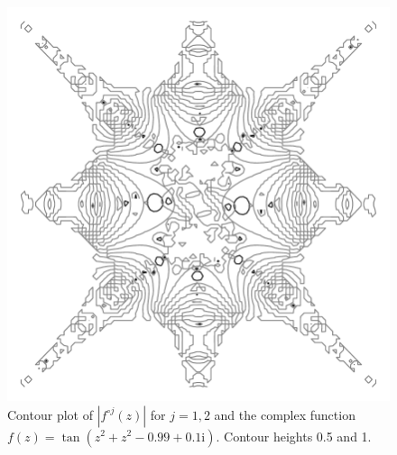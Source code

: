 \documentclass[12pt, a4paper]{amsart}
\newcommand{\mi}{\text{i}}  %
\begin{document}
\pagebreak
\begin{figure}[!ht]
\includegraphics[width=160mm]{mite.pdf}
\caption{
Contour plot of $|f^{\circ j}(z)|$ for $j = 1, 2$ and the complex function $f(z) = \tan(z^2  + z^2 - 0.99 + 0.1\mi)$.
Contour heights 0.5 and 1.
}
\end{figure}
\pagebreak
\end{document}
